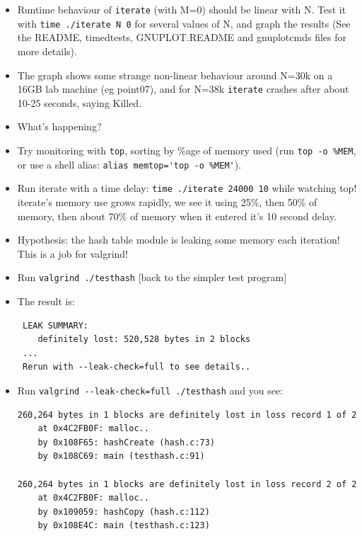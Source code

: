 \documentclass[handout]{beamer}
\newcommand{\pitem}{\pause \item}
\begin{document}
\begin{frame}[fragile]
    \begin{itemize}

    \item
      Runtime behaviour of \verb+iterate+ (with M=0) \alert{should be linear with N}.
      Test it with \verb+time ./iterate N 0+ for several values of N,
      and graph the results
      (See the README, timedtests, GNUPLOT.README and gnuplotcmds files for more details).

    \pitem
      The graph shows \alert{some strange non-linear behaviour} around N=30k
      on a 16GB lab machine (eg point07),
      \pause
      and for N=38k \verb+iterate+ crashes after about 10-25 seconds,
      saying \alert{Killed}.
    \item
      What's happening?
    \pitem
      Try monitoring with \verb+top+, sorting by \%age of memory used (run \verb+top -o %MEM+, or use a shell alias: \verb+alias memtop='top -o %MEM'+).
    \pause
    \item
      Run iterate with a time delay: \verb+time ./iterate 24000 10+
      while watching top!
      \pause
      iterate's memory use
      \alert{grows rapidly}, we see it using 25\%, then 50\% of memory,
      then about 70\% of memory when it entered it's 10 second delay.
    \pitem
      Hypothesis: the hash table module is leaking some memory each iteration!
      \pause
      This is a job for valgrind!
    \end{itemize}
\end{frame}

\begin{frame}[fragile]
    \begin{itemize}
    \item
      Run \verb+valgrind ./testhash+ [back to the simpler test program]
    \pitem
      The result is:
\begin{verbatim}
 LEAK SUMMARY:
    definitely lost: 520,528 bytes in 2 blocks
 ...
 Rerun with --leak-check=full to see details..
\end{verbatim}
    \pause
    \item
      Run \verb+valgrind --leak-check=full ./testhash+ and you see:

\begin{verbatim}
260,264 bytes in 1 blocks are definitely lost in loss record 1 of 2
    at 0x4C2FB0F: malloc..
    by 0x108F65: hashCreate (hash.c:73)
    by 0x108C69: main (testhash.c:91)
 
260,264 bytes in 1 blocks are definitely lost in loss record 2 of 2
    at 0x4C2FB0F: malloc..
    by 0x109059: hashCopy (hash.c:112)
    by 0x108E4C: main (testhash.c:123)
\end{verbatim}

  \end{itemize}
\end{frame}
\end{document}
